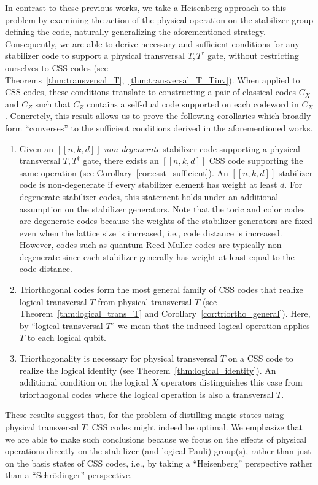 \documentclass[twoside,romanappendices]{IEEEtran}
\newcommand{\red}[1]{{\color{red}#1}}
\newcommand{\llbr}{[\![}
\newcommand{\rrbr}{]\!]}
\begin{document}
In contrast to these previous works, we take a Heisenberg approach to this problem by examining the action of the physical operation on the stabilizer group defining the code, naturally generalizing the aforementioned strategy.
Consequently, we are able to derive necessary and sufficient conditions for any stabilizer code to support a physical transversal $T, T^{\dagger}$ gate, without restricting ourselves to CSS codes (see Theorems~\ref{thm:transversal_T},~\ref{thm:transversal_T_Tinv}).
When applied to CSS codes, these conditions translate to constructing a pair of classical codes $C_X$ and $C_Z$ such that $C_Z$ contains a self-dual code supported on each codeword in $C_X$.
Concretely, this result allows us to prove the following corollaries which broadly form ``converses'' to the sufficient conditions derived in the aforementioned works.
\begin{enumerate}
    \item Given an $\llbr n,k,d \rrbr$ \emph{non-degenerate} stabilizer code supporting a physical transversal $T, T^{\dagger}$ gate, there exists an $\llbr n,k,d \rrbr$ CSS code supporting the same operation (see Corollary~\ref{cor:csst_sufficient}).
    An $\llbr n,k,d \rrbr$ stabilizer code is non-degenerate if every stabilizer element has weight at least $d$.
    For degenerate stabilizer codes, this statement holds under an additional assumption on the stabilizer generators.
    Note that the toric and color codes are degenerate codes because the weights of the stabilizer generators are fixed even when the lattice size is increased, i.e., code distance is increased.
However, codes such as quantum Reed-Muller codes are typically non-degenerate since each stabilizer generally has weight at least equal to the code distance.

    
    \item Triorthogonal codes form the most general family of CSS codes that realize logical transversal $T$ from physical transversal $T$ (see Theorem~\ref{thm:logical_trans_T} and Corollary~\ref{cor:triortho_general}). 
    Here, by ``logical transversal $T$'' we mean that the induced logical operation applies $T$ to each logical qubit.
    
    \item Triorthogonality is necessary for physical transversal $T$ on a CSS code to realize the logical identity (see Theorem~\ref{thm:logical_identity}).
    An additional condition on the logical $X$ operators distinguishes this case from triorthogonal codes where the logical operation is also a transversal $T$.
\end{enumerate}
These results suggest that, for the problem of distilling magic states using physical transversal $T$, CSS codes might indeed be optimal.
We emphasize that we are able to make such conclusions because we focus on the effects of physical operations directly on the stabilizer (and logical Pauli) group(s), rather than just on the basis states of CSS codes, i.e., by taking a ``Heisenberg'' perspective rather than a ``Schr{\"o}dinger'' perspective.
\end{document}
